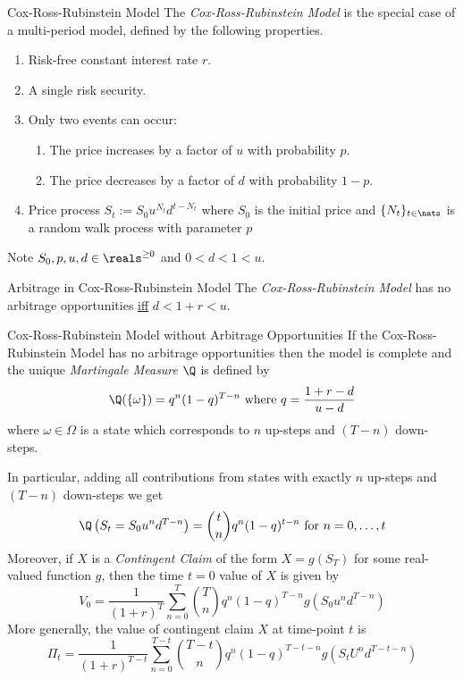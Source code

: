 \documentclass[11pt,a4paper]{article}
\begin{document}
  \begin{definition}{Cox-Ross-Rubinstein Model}
    The \textit{Cox-Ross-Rubinstein Model} is the special case of a multi-period model, defined by the following properties.
    \begin{enumerate}
      \item Risk-free constant interest rate $r$.
      \item A single risk security.
      \item Only two events can occur:
      \begin{enumerate}
        \item The price increases by a factor of $u$ with probability $p$. 
        \item The price decreases by a factor of $d$ with probability $1-p$. 
      \end{enumerate}
      \item Price process $S_t:=S_0u^{N_t}d^{t-N_t}$ where $S_0$ is the initial price and $\{N_t\}_{t\in\nats}$ is a random walk process with parameter $p$
    \end{enumerate}
    Note $S_0,p,u,d\in\reals^{\geq0}$ and $0<d<1<u$.
  \end{definition}

  \begin{theorem}{Arbitrage in Cox-Ross-Rubinstein Model}\label{the_arbitrage_in_cox_ross_rubinstein_model}
    The \textit{Cox-Ross-Rubinstein Model} has no arbitrage opportunities \underline{iff} $d<1+r<u$.
  \end{theorem}

  \begin{remark}{Cox-Ross-Rubinstein Model without Arbitrage Opportunities}
    If the Cox-Ross-Rubinstein Model has no arbitrage opportunities then the model is complete and the unique \textit{Martingale Measure} $\Q$ is defined by
    \[ \Q(\{\omega\})=q^n(1-q)^{T-n}\text{ where }q=\frac{1+r-d}{u-d} \]
    where $\omega\in\Omega$ is a state which corresponds to $n$ up-steps and $(T-n)$ down-steps.
    \par In particular, adding all contributions from states with exactly $n$ up-steps and $(T-n)$ down-steps we get
    \[ \Q\left(S_t=S_0u^nd^{T-n}\right)={t \choose n}q^n(1-q)^{t-n}\text{ for }n=0,\dots,t \]
    Moreover, if $X$ is a \textit{Contingent Claim} of the form $X=g(S_T)$ for some real-valued function $g$, then the time $t=0$ value of $X$ is given by
    \[ V_0=\frac1{(1+r)^T}\sum_{n=0}^T{T\choose n}q^n(1-q)^{T-n}g(S_0u^nd^{T-n}) \]
    More generally, the value of contingent claim $X$ at time-point $t$ is
    \[ \Pi_t=\frac1{(1+r)^{T-t}}\sum_{n=0}^{T-t}{T-t\choose n}q^n(1-q)^{T-t-n}g(S_tU^nd^{T-t-n}) \]
  \end{remark}
\end{document}
